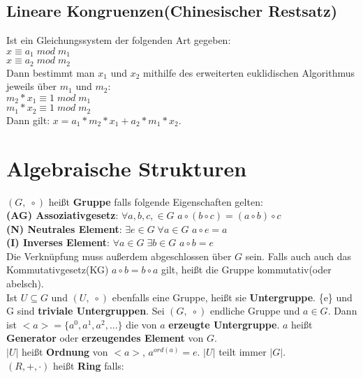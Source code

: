 \documentclass[11pt]{article}
\begin{document}
\subsection{Lineare Kongruenzen(Chinesischer Restsatz)}
Ist ein Gleichungssystem der folgenden Art gegeben:\\
$x \equiv a_1\; mod\; m_1$\\ $x \equiv a_2\; mod\; m_2$\\
Dann bestimmt man $x_1$ und $x_2$ mithilfe des erweiterten euklidischen Algorithmus jeweils {\"u}ber $m_1$ und $m_2$:\\
$m_2 * x_1 \equiv 1\; mod\; m_1$ \\ $m_1 * x_2 \equiv 1\; mod\; m_2$\\
Dann gilt: $x=a_1*m_2*x_1+a_2*m_1*x_2$.

\section{Algebraische Strukturen}
$(G,\; \circ)$ hei{\ss}t {\bfseries Gruppe} falls folgende Eigenschaften gelten:\\
{\bfseries (AG) Assoziativgesetz}: $\forall a,b,c, \in G$ \hspace{5mm} $a \circ (b \circ c) = (a \circ b) \circ c$\\
{\bfseries (N) Neutrales Element}: $\exists e \in G\; \forall a \in G$\hspace{5mm} $a \circ e = a$\\
{\bfseries (I) Inverses Element}: $\forall a \in G\; \exists b \in G$\hspace{5mm} $a \circ b = e$\\
Die Verkn{\"u}pfung muss au{\ss}erdem abgeschlossen {\"u}ber $G$ sein.
Falls auch auch das Kommutativgesetz(KG) $a \circ b = b \circ a$ gilt, hei{\ss}t die Gruppe kommutativ(oder abelsch).\\
Ist $U \subseteq G$ und $(U,\; \circ)$ ebenfalls eine Gruppe, hei{\ss}t sie {\bfseries Untergruppe}. \{e\} und G sind {\bfseries triviale Untergruppen}.
Sei $(G,\; \circ)$ endliche Gruppe und $a\in G$. Dann ist $<a> = \{a^0, a^1, a^2,...\}$ die von $a$ {\bfseries erzeugte Untergruppe}. $a$ hei{\ss}t {\bfseries Generator} oder {\bfseries erzeugendes Element} von $G$.\\
$\mathopen| U \mathclose|$ hei{\ss}t {\bfseries Ordnung} von $<a>$, $a^{ord(a)}=e$. $\mathopen| U \mathclose|$ teilt immer $\mathopen| G \mathclose|$.\\
$(R,+,\cdot)$ hei{\ss}t {\bfseries Ring} falls:\\
\end{document}
